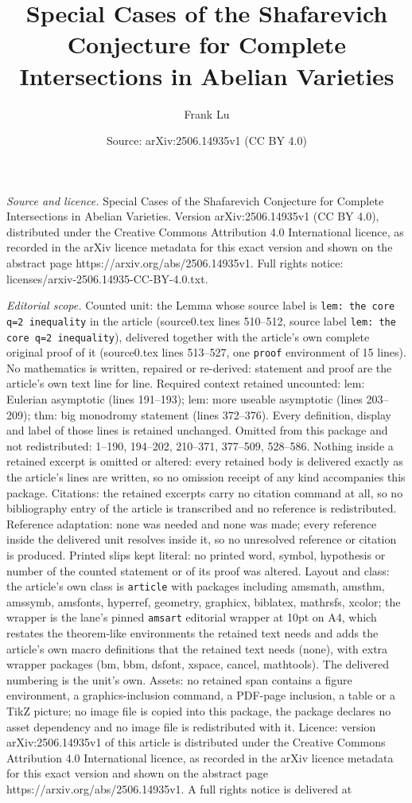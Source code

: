 \documentclass[10pt,a4paper]{amsart}
\title[Special Cases of the Shafarevich Conjecture for Complete Int]{Special Cases of the Shafarevich Conjecture for Complete Intersections in Abelian Varieties}
\author{Frank Lu}
\date{Source: arXiv:2506.14935v1 (CC BY 4.0)}
\begin{document}
\maketitle

\noindent\emph{Source and licence.} Special Cases of the Shafarevich Conjecture for Complete Intersections in Abelian Varieties. Version arXiv:2506.14935v1 (CC BY 4.0), distributed under the Creative Commons Attribution 4.0 International licence, as recorded in the arXiv licence metadata for this exact version and shown on the abstract page https://arxiv.org/abs/2506.14935v1. Full rights notice: licenses/arxiv-2506.14935-CC-BY-4.0.txt.\par\smallskip

\noindent\textit{Editorial scope.} Counted unit: the Lemma whose source label is \texttt{lem: the core q=2 inequality} in the article (source0.tex lines 510--512, source label \texttt{lem: the core q=2 inequality}), delivered together with the article's own complete original proof of it (source0.tex lines 513--527, one \texttt{proof} environment of 15 lines). No mathematics is written, repaired or re-derived: statement and proof are the article's own text line for line. Required context retained uncounted: lem: Eulerian asymptotic (lines 191--193); lem: more useable asymptotic (lines 203--209); thm: big monodromy statement (lines 372--376). Every definition, display and label of those lines is retained unchanged. Omitted from this package and not redistributed: 1--190, 194--202, 210--371, 377--509, 528--586. Nothing inside a retained excerpt is omitted or altered: every retained body is delivered exactly as the article's lines are written, so no omission receipt of any kind accompanies this package. Citations: the retained excerpts carry no citation command at all, so no bibliography entry of the article is transcribed and no reference is redistributed. Reference adaptation: none was needed and none was made; every reference inside the delivered unit resolves inside it, so no unresolved reference or citation is produced. Printed slips kept literal: no printed word, symbol, hypothesis or number of the counted statement or of its proof was altered. Layout and class: the article's own class is \texttt{article} with packages including amsmath, amsthm, amssymb, amsfonts, hyperref, geometry, graphicx, biblatex, mathrsfs, xcolor; the wrapper is the lane's pinned \texttt{amsart} editorial wrapper at 10pt on A4, which restates the theorem-like environments the retained text needs and adds the article's own macro definitions that the retained text needs (none), with extra wrapper packages (bm, bbm, dsfont, xspace, cancel, mathtools). The delivered numbering is the unit's own. Assets: no retained span contains a figure environment, a graphics-inclusion command, a PDF-page inclusion, a table or a TikZ picture; no image file is copied into this package, the package declares no asset dependency and no image file is redistributed with it. Licence: version arXiv:2506.14935v1 of this article is distributed under the Creative Commons Attribution 4.0 International licence, as recorded in the arXiv licence metadata for this exact version and shown on the abstract page https://arxiv.org/abs/2506.14935v1. A full rights notice is delivered at 
\end{document}
